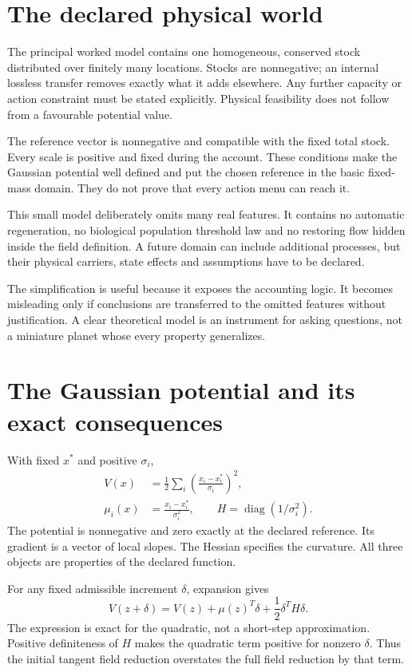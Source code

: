 \section{The declared physical world}
The principal worked model contains one homogeneous, conserved stock distributed over finitely many locations. Stocks are nonnegative; an internal lossless transfer removes exactly what it adds elsewhere. Any further capacity or action constraint must be stated explicitly. Physical feasibility does not follow from a favourable potential value.

The reference vector is nonnegative and compatible with the fixed total stock. Every scale is positive and fixed during the account. These conditions make the Gaussian potential well defined and put the chosen reference in the basic fixed-mass domain. They do not prove that every action menu can reach it.

This small model deliberately omits many real features. It contains no automatic regeneration, no biological population threshold law and no restoring flow hidden inside the field definition. A future domain can include additional processes, but their physical carriers, state effects and assumptions have to be declared.

The simplification is useful because it exposes the accounting logic. It becomes misleading only if conclusions are transferred to the omitted features without justification. A clear theoretical model is an instrument for asking questions, not a miniature planet whose every property generalizes.

\section{The Gaussian potential and its exact consequences}
With fixed $x^*$ and positive $\sigma_i$,
\begin{align}
 V(x)&=\frac12\sum_i\left(\frac{x_i-x_i^*}{\sigma_i}\right)^2,\\
 \mu_i(x)&=\frac{x_i-x_i^*}{\sigma_i^2},\qquad
 H=\operatorname{diag}(1/\sigma_i^2).
\end{align}
The potential is nonnegative and zero exactly at the declared reference. Its gradient is a vector of local slopes. The Hessian specifies the curvature. All three objects are properties of the declared function.

For any fixed admissible increment $\delta$, expansion gives
\begin{equation}
 V(z+\delta)=V(z)+\mu(z)^T\delta+\frac12\delta^TH\delta.
\end{equation}
The expression is exact for the quadratic, not a short-step approximation. Positive definiteness of $H$ makes the quadratic term positive for nonzero $\delta$. Thus the initial tangent field reduction overstates the full field reduction by that term.


